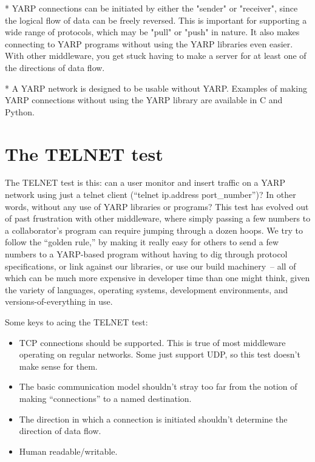 \documentclass[letterpaper]{article}
\begin{document}
* YARP connections can be initiated by either the "sender" or "receiver", since the logical flow of data can be freely reversed.  This is important for supporting a wide range of protocols, which may be "pull" or "push" in nature.  It also makes connecting to YARP programs without using the YARP libraries even easier.  With other middleware, you get stuck having to make a server for at least one of the directions of data flow.

* A YARP network is designed to be usable without YARP.  Examples of making YARP connections without using the YARP library are available in C and Python.


\section{The TELNET test}

The TELNET test is this: can a user monitor and insert traffic on a
YARP network using just a telnet client (``telnet ip.address
port\_number'')?  In other words, without any use of YARP libraries or
programs?  This test has evolved out of past frustration with other
middleware, where simply passing a few numbers to a collaborator's
program can require jumping through a dozen hoops.  We try to follow
the ``golden rule,'' by making it really easy for others to send a few
numbers to a YARP-based program without having to dig through protocol
specifications, or link against our libraries, or use our build
machinery~-- all of which can be much more expensive in developer time
than one might think, given the variety of languages, operating
systems, development environments, and versions-of-everything in use.

Some keys to acing the TELNET test:

\begin{itemize}

\item TCP connections should be supported.  
  This is true of most middleware operating on regular
  networks. Some just support UDP, so this test doesn't
  make sense for them.

\item The basic communication model shouldn't stray too far from the
  notion of making ``connections'' to a named destination.

\item The direction in which a connection is initiated shouldn't
  determine the direction of data flow.

\item Human readable/writable.

\end{itemize}
\end{document}
